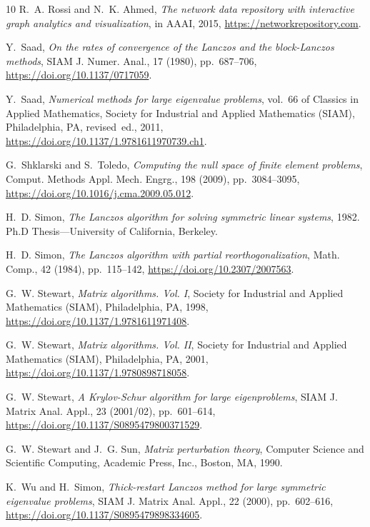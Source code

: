 \documentclass{siamart190516}
\begin{document}
\begin{thebibliography}{10}
{\sc R.~A. Rossi and N.~K. Ahmed}, {\em The network data repository with
  interactive graph analytics and visualization}, in AAAI, 2015,
  \url{https://networkrepository.com}.

{\sc Y.~Saad}, {\em On the rates of convergence of the {L}anczos and the
  block-{L}anczos methods}, SIAM J. Numer. Anal., 17 (1980), pp.~687--706,
  \url{https://doi.org/10.1137/0717059}.

{\sc Y.~Saad}, {\em Numerical methods for large eigenvalue problems}, vol.~66
  of Classics in Applied Mathematics, Society for Industrial and Applied
  Mathematics (SIAM), Philadelphia, PA, revised~ed., 2011,
  \url{https://doi.org/10.1137/1.9781611970739.ch1}.

{\sc G.~Shklarski and S.~Toledo}, {\em Computing the null space of finite
  element problems}, Comput. Methods Appl. Mech. Engrg., 198 (2009),
  pp.~3084--3095, \url{https://doi.org/10.1016/j.cma.2009.05.012}.

{\sc H.~D. Simon}, {\em The {L}anczos algorithm for solving symmetric linear
  systems}, 1982.
\newblock Ph.D Thesis---University of California, Berkeley.

{\sc H.~D. Simon}, {\em The {L}anczos algorithm with partial
  reorthogonalization}, Math. Comp., 42 (1984), pp.~115--142,
  \url{https://doi.org/10.2307/2007563}.

{\sc G.~W. Stewart}, {\em Matrix algorithms. {V}ol. {I}}, Society for
  Industrial and Applied Mathematics (SIAM), Philadelphia, PA, 1998,
  \url{https://doi.org/10.1137/1.9781611971408}.

{\sc G.~W. Stewart}, {\em Matrix algorithms. {V}ol. {II}}, Society for
  Industrial and Applied Mathematics (SIAM), Philadelphia, PA, 2001,
  \url{https://doi.org/10.1137/1.9780898718058}.

{\sc G.~W. Stewart}, {\em A {K}rylov-{S}chur algorithm for large
  eigenproblems}, SIAM J. Matrix Anal. Appl., 23 (2001/02), pp.~601--614,
  \url{https://doi.org/10.1137/S0895479800371529}.

{\sc G.~W. Stewart and J.~G. Sun}, {\em Matrix perturbation theory}, Computer
  Science and Scientific Computing, Academic Press, Inc., Boston, MA, 1990.

{\sc K.~Wu and H.~Simon}, {\em Thick-restart {L}anczos method for large
  symmetric eigenvalue problems}, SIAM J. Matrix Anal. Appl., 22 (2000),
  pp.~602--616, \url{https://doi.org/10.1137/S0895479898334605}.


\end{thebibliography}
\end{document}
